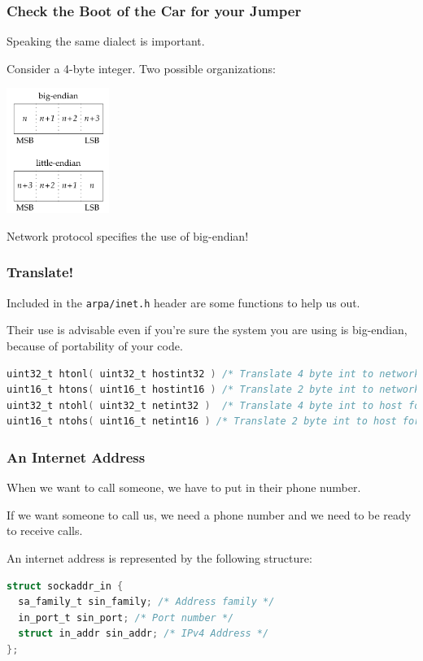 \begin{frame}
\frametitle{Check the Boot of the Car for your Jumper}

Speaking the same dialect is important. 

Consider a 4-byte integer. Two possible organizations:

\begin{center}
	\includegraphics[width=0.25\textwidth]{images/endian}
\end{center}

Network protocol specifies the use of big-endian!

\end{frame}


\begin{frame}[fragile]
\frametitle{Translate!}

Included in the \texttt{arpa/inet.h} header are some functions to help us out. 

Their use is advisable even if you're sure the system you are using is big-endian, because of portability of your code.

\begin{lstlisting}[language=C]
uint32_t htonl( uint32_t hostint32 ) /* Translate 4 byte int to network format */
uint16_t htons( uint16_t hostint16 ) /* Translate 2 byte int to network format */
uint32_t ntohl( uint32_t netint32 )  /* Translate 4 byte int to host format */
uint16_t ntohs( uint16_t netint16 ) /* Translate 2 byte int to host format */
\end{lstlisting}


\end{frame}


\begin{frame}[fragile]
\frametitle{An Internet Address}

When we want to call someone, we have to put in their phone number. 

If we want someone to call us, we need a phone number and we need to be ready to receive calls. 

An internet address is represented by the following structure:
\begin{lstlisting}[language=C]
struct sockaddr_in {
  sa_family_t sin_family; /* Address family */
  in_port_t sin_port; /* Port number */
  struct in_addr sin_addr; /* IPv4 Address */
};
\end{lstlisting}

\end{frame}


